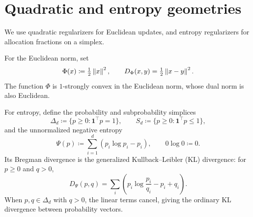 \section{Quadratic and entropy geometries}\label{sec:intro:geometry}

We use quadratic regularizers for Euclidean updates,
and entropy regularizers for allocation fractions on a simplex.

For the Euclidean norm, set
\begin{equation}\label{eq:intro:quadratic-geometry}
 \Phi(x)\coloneqq\tfrac12\left\lVert x \right\rVert^2,\qquad
 D_\Phi(x,y)=\tfrac12\left\lVert x-y \right\rVert^2.
\end{equation}
The function $\Phi$ is $1$-strongly convex in the Euclidean norm, whose
dual norm is also Euclidean.

For entropy, define the probability and subprobability simplices
\begin{equation}\label{eq:intro:simplices}
 \Delta_d\coloneqq\{p\ge0:\mathbf1^\top p=1\},\qquad
 S_d\coloneqq\{p\ge0:\mathbf1^\top p\le1\},
\end{equation}
and the unnormalized negative entropy
\begin{equation}\label{eq:intro:negentropy}
 \Psi(p)\coloneqq\sum_{i=1}^d(p_i\log p_i-p_i),\qquad 0\log0\coloneqq0.
\end{equation}
Its Bregman divergence is the generalized Kullback--Leibler (KL) divergence:
for $p\ge0$ and $q>0$,
\begin{equation}\label{eq:intro:generalized-kl}
 D_\Psi(p,q)=\sum_i\left(p_i\log\frac{p_i}{q_i}-p_i+q_i\right).
\end{equation}
When $p,q\in\Delta_d$ with $q>0$, the linear terms cancel, giving the
ordinary KL divergence between probability vectors.

